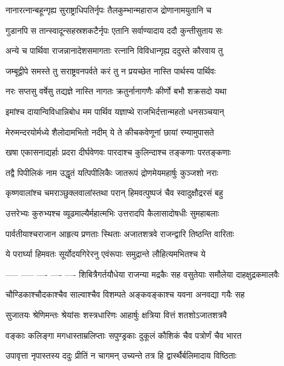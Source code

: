 \twolineshloka
{नानारत्नान्बहून्गृह्य सुराष्ट्राधिपतिर्नृपः}
{तैलकुम्भान्महाराज द्रोणानामयुतानि च}


\twolineshloka
{गुडानपि स तान्स्वादून्सहस्रशकटैर्नृपः}
{एतानि सर्वाण्यादाय ददौ कुन्तीसुताय सः}


\twolineshloka
{अन्ये च पार्थिवा राजन्नानादेशसमागताः}
{रत्नानि विविधान्गृह्य ददुस्ते कौरवाय तु}


\twolineshloka
{जम्बूद्वीपे समस्ते तु सराष्ट्रवनपर्वते}
{करं तु न प्रयच्छेत नास्ति पार्थस्य पार्थिवः}


\twolineshloka
{नरः सप्तसु वर्षेसु तद्यज्ञे नास्ति नागतः}
{क्रतुर्नानागणैः कीर्णो बभौ शक्रसदो यथा}


\twolineshloka
{इमांश्च दायान्विविधान्निबोध मम पार्थिव}
{यज्ञाप्थे राजभिर्दत्तान्महतो धनसञ्चयान्}


\twolineshloka
{मेरुमन्दरयोर्मध्ये शैलोदामभितो नदीम्}
{ये ते कीचकवेणूनां छायां रम्यामुपासते}


\twolineshloka
{खषा एकासनाद्यर्हाः प्रदरा दीर्घवेणवः}
{पारदाश्च कुलिन्दाश्च तङ्कणाः परतङ्कणाः}


\twolineshloka
{तद्वै पिपीलिकं नाम उद्धृतं यत्पिपीलिकैः}
{जातरूपं द्रोणमेयमहार्षुः कुञ्जशो नराः}


\twolineshloka
{कृष्णवालांश्च चमराञ्छुक्लवालांस्तथा परान्}
{हिमवत्पुष्पजं चैव स्वादुक्षौद्ररसं बहु}


\twolineshloka
{उत्तरेभ्यः कुरुभ्यश्च व्यूढमाल्यैर्महात्मभिः}
{उत्तरादपि कैलासादोषधीः सुमहाबलाः}


\twolineshloka
{पार्वतीयाश्चराजान आहृत्य प्रणताः स्थिताः}
{अजातशत्रवे राजन्द्वारि तिष्ठन्ति वारिताः}


\twolineshloka
{ये परार्घ्या हिमवतः सूर्योदयगिरेरनु}
{एवंरूपाः समुद्रान्ते लौहित्यमभितश्च ये}


-----
-----
----
----
----
\twolineshloka
{शिबित्रैगर्तयौधेया राजन्या मद्रकैः सह}
{वसुतेयाः समौलेया दाहक्षुद्रकमालवैः}


\twolineshloka
{चौण्डिकाश्चौदकाश्चैव साल्वाश्चैव विशम्पते}
{अङ्कवङ्काश्च यवना अनवद्या गयैः सह}


\twolineshloka
{सुजातयः श्रेणिमन्तः श्रेयांसः शस्त्रधारिणः}
{आहार्षुः क्षत्रिया वित्तं शतशोऽजातशत्रवै}


\twolineshloka
{वङ्काः कलिङ्गा मगधास्ताम्रलिप्ताः सपुण्ड्रकाः}
{दुकूलं कौशिकं चैव पत्रोर्णं चैव भारत}


\twolineshloka
{उपावृत्ता नृपास्तस्य ददुः प्रीतिं न चागमन्}
{उच्यन्ते तत्र हि द्वार्स्थैर्बलिमादाय विष्ठिताः}


